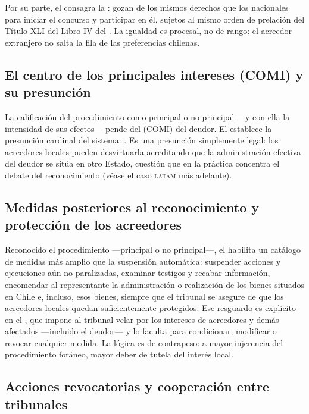 Por su parte, el  consagra la : gozan
de los mismos derechos que los nacionales para iniciar el concurso y participar en él, sujetos al
mismo orden de prelación del Título XLI del Libro IV del \cc{}. La igualdad es procesal, no de
rango: el acreedor extranjero no salta la fila de las preferencias chilenas.

\subsection{El centro de los principales intereses (COMI) y su presunción}

La calificación del procedimiento como principal o no principal ---y con ella la intensidad de sus
efectos--- pende del  (COMI) del deudor. El
  establece la presunción cardinal del sistema: . Es una presunción simplemente
legal: los acreedores locales pueden desvirtuarla acreditando que la administración efectiva del
deudor se sitúa en otro Estado, cuestión que en la práctica concentra el debate del
reconocimiento (véase el caso \textsc{latam} más adelante).

\subsection{Medidas posteriores al reconocimiento y protección de los acreedores}

Reconocido el procedimiento ---principal o no principal---, el  habilita un catálogo
 de medidas más amplio que la suspensión automática: suspender acciones y
ejecuciones aún no paralizadas, examinar testigos y recabar información, encomendar al
representante la administración o realización de los bienes situados en Chile e, incluso,
 esos bienes, siempre que el tribunal se asegure de que los acreedores
locales quedan suficientemente protegidos. Ese resguardo es explícito en el , que impone
al tribunal velar por los intereses de acreedores y demás afectados ---incluido el deudor--- y lo
faculta para condicionar, modificar o revocar cualquier medida. La lógica es de contrapeso: a
mayor injerencia del procedimiento foráneo, mayor deber de tutela del interés local.

\subsection{Acciones revocatorias y cooperación entre tribunales}

